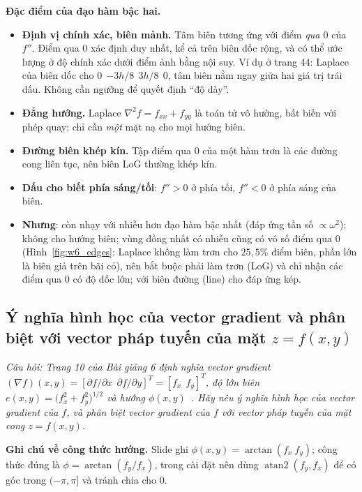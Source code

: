 \textbf{Đặc điểm của đạo hàm bậc hai.}
\begin{itemize}
    \item \textbf{Định vị chính xác, biên mảnh.} Tâm biên tương ứng với điểm \emph{qua $0$} của $f''$. Điểm qua $0$ xác định duy nhất, kể cả trên biên dốc rộng, và có thể ước lượng ở độ chính xác dưới điểm ảnh bằng nội suy. Ví dụ ở trang 44: Laplace của biên dốc cho $0\ \ {-3h/8}\ \ 3h/8\ \ 0$, tâm biên nằm ngay giữa hai giá trị trái dấu. Không cần ngưỡng để quyết định ``độ dày''.
    \item \textbf{Đẳng hướng.} Laplace $\nabla^2 f = f_{xx} + f_{yy}$ là toán tử vô hướng, bất biến với phép quay: chỉ cần \emph{một} mặt nạ cho mọi hướng biên.
    \item \textbf{Đường biên khép kín.} Tập điểm qua $0$ của một hàm trơn là các đường cong liên tục, nên biên LoG thường khép kín.
    \item \textbf{Dấu cho biết phía sáng/tối}: $f'' > 0$ ở phía tối, $f'' < 0$ ở phía sáng của biên.
    \item \textbf{Nhưng}: còn nhạy với nhiễu hơn đạo hàm bậc nhất (đáp ứng tần số $\propto \omega^2$); không cho hướng biên; vùng đồng nhất có nhiễu cũng có vô số điểm qua $0$ (Hình~\ref{fig:w6_edges}: Laplace không làm trơn cho $25{,}5\%$ điểm biên, phần lớn là biên giả trên bãi cỏ), nên bắt buộc phải làm trơn (LoG) và chỉ nhận các điểm qua $0$ có độ dốc lớn; với biên đường (line) cho đáp ứng kép.
\end{itemize}

\subsection{Ý nghĩa hình học của vector gradient và phân biệt với vector pháp tuyến của mặt \texorpdfstring{$z = f(x, y)$}{z = f(x, y)}}
\label{subsec:w6_gradient_geometry}

\textit{Câu hỏi: Trang 10 của Bài giảng 6 định nghĩa vector gradient $(\nabla f)(x, y) = [\partial f/\partial x\ \ \partial f/\partial y]^T = [f_x\ \ f_y]^T$, độ lớn biên $e(x, y) = \big(f_x^2 + f_y^2\big)^{1/2}$ và hướng $\phi(x, y)$~\citep{xlav_lec6}. Hãy nêu ý nghĩa hình học của vector gradient của $f$, và phân biệt vector gradient của $f$ với vector pháp tuyến của mặt cong $z = f(x, y)$.}

\textbf{Ghi chú về công thức hướng.} Slide ghi $\phi(x, y) = \arctan(f_x\ f_y)$; công thức đúng là $\phi = \arctan(f_y / f_x)$, trong cài đặt nên dùng $\operatorname{atan2}(f_y, f_x)$ để có góc trong $(-\pi, \pi]$ và tránh chia cho $0$.

